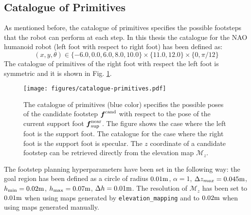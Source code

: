 \subsection{Catalogue of Primitives}
As mentioned before, the catalogue of primitives specifies the possible 
footsteps that the robot can perform at each step. In this thesis the catalogue 
for the NAO humanoid robot (left foot with respect to right foot)
has been defined as:
\begin{equation}
  (x, y, \theta) \in \{ -6.0, 0.0, 6.0, 8.0, 10.0 \} \times
      \{ 11.0, 12.0 \} \times \{ 0, \pi/12 \}
\end{equation}
The catalogue of primitives of the right foot with respect the left foot is 
symmetric and it is shown in Fig. \ref{fig:catalogue-primitives}.
\begin{figure}
    \centering
    \texttt{[image: figures/catalogue-primitives.pdf]}
    \caption{The catalogue of primitives (blue color) specifies the possible
        poses of the
        candidate footstep ${\mbox{\boldmath $f$}}^{\rm cand}$ with respect to the pose of the 
        current support foot ${\mbox{\boldmath $f$}}_{\rm sup}^{\rm near}$. The figure shows the 
        case where the left foot is the support foot. The catalogue for the 
        case where the right foot is the support foot is specular. The $z$
        coordinate of a candidate footstep can be retrieved directly from 
        the elevation map $\mathcal{M}_z$.}
    \label{fig:catalogue-primitives}
\end{figure}
The footstep planning hyperparameters have been set in the following way:
the goal region has been defined as a circle of radius $0.01 {\rm m}$,
$\alpha=1$,
$\Delta z_{max}=0.045 {\rm m}$, $h_{\min}=0.02 {\rm m}$,
$h_{\max}=0.07 {\rm m}$, $\Delta h=0.01 {\rm m}$.
The resolution of $\mathcal{M}_z$ has been set to $0.01 {\rm m}$ when using maps 
generated by \texttt{elevation\_mapping} and to $0.02 {\rm m}$ when using maps 
generated manually.

